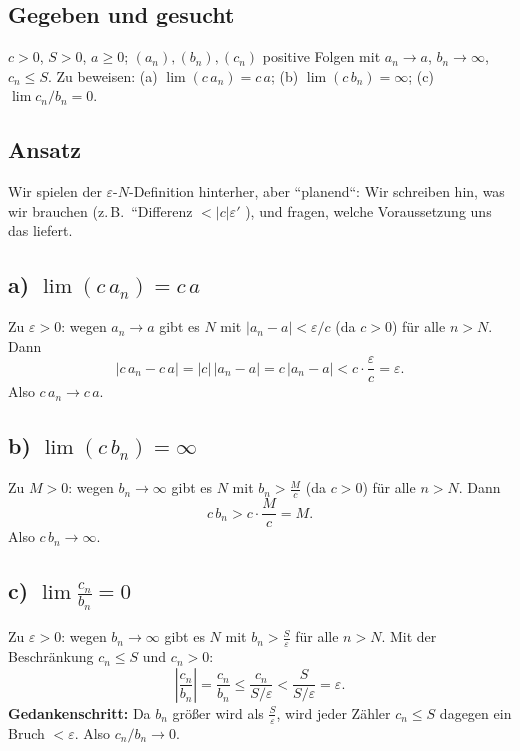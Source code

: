 

\subsection*{Gegeben und gesucht}
$c>0$, $S>0$, $a\ge0$; $(a_n),(b_n),(c_n)$ positive Folgen mit
$a_n\to a$, $b_n\to\infty$, $c_n\le S$. Zu beweisen:
(a) $\lim(c\,a_n)=c\,a$; (b) $\lim(c\,b_n)=\infty$; (c) $\lim c_n/b_n=0$.

\subsection*{Ansatz}
Wir spielen der $\varepsilon$-$N$-Definition hinterher, aber ``planend``:
Wir schreiben hin, was wir brauchen (z.\,B.\ ``Differenz $<|c|\varepsilon'$
), und fragen, welche Voraussetzung uns das liefert.

\subsection*{a) $\lim(c\,a_n)=c\,a$}
Zu $\varepsilon>0$: wegen $a_n\to a$ gibt es $N$ mit
$|a_n-a|<\varepsilon/c$ (da $c>0$) f\"ur alle $n>N$. Dann
\begin{equation}
  |c\,a_n-c\,a|=|c|\,|a_n-a|=c\,|a_n-a|<c\cdot\frac\varepsilon c
  =\varepsilon .
\end{equation}
Also $c\,a_n\to c\,a$. \checkmark

\subsection*{b) $\lim(c\,b_n)=\infty$}
Zu $M>0$: wegen $b_n\to\infty$ gibt es $N$ mit $b_n>\tfrac M c$ (da
$c>0$) f\"ur alle $n>N$. Dann
\begin{equation}
  c\,b_n>c\cdot\frac Mc=M .
\end{equation}
Also $c\,b_n\to\infty$. \checkmark

\subsection*{c) $\lim\frac{c_n}{b_n}=0$}
Zu $\varepsilon>0$: wegen $b_n\to\infty$ gibt es $N$ mit
$b_n>\tfrac S\varepsilon$ f\"ur alle $n>N$. Mit der Beschr\"ankung
$c_n\le S$ und $c_n>0$:
\begin{equation}
  \left|\frac{c_n}{b_n}\right|=\frac{c_n}{b_n}\le\frac{c_n}{S/\varepsilon}
  <\frac{S}{S/\varepsilon}=\varepsilon .
\end{equation}
\textbf{Gedankenschritt:} Da $b_n$ gr\"o\ss{}er wird als $\tfrac S\varepsilon$,
wird jeder Z\"ahler $c_n\le S$ dagegen ein Bruch $<\varepsilon$. Also
$c_n/b_n\to0$. \checkmark

